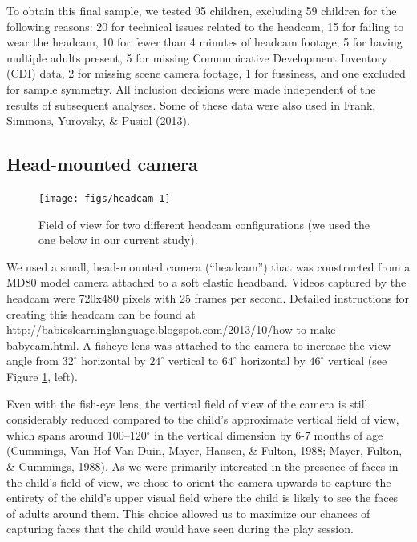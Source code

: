 \documentclass[10pt, letterpaper]{article}
\newenvironment{CodeChunk}{}{}
\begin{document}
To obtain this final sample, we tested 95 children, excluding 59
children for the following reasons: 20 for technical issues related to
the headcam, 15 for failing to wear the headcam, 10 for fewer than 4
minutes of headcam footage, 5 for having multiple adults present, 5 for
missing Communicative Development Inventory (CDI) data, 2 for missing
scene camera footage, 1 for fussiness, and one excluded for sample
symmetry. All inclusion decisions were made independent of the results
of subsequent analyses. Some of these data were also used in Frank,
Simmons, Yurovsky, \& Pusiol (2013).

\subsection{Head-mounted camera}\label{head-mounted-camera}

\begin{CodeChunk}
\begin{figure}[H]

{\centering \texttt{[image: figs/headcam-1]} 

}

\caption[Field of view for two different headcam configurations (we used the one below in our current study)]{Field of view for two different headcam configurations (we used the one below in our current study).}\label{fig:headcam}
\end{figure}
\end{CodeChunk}

We used a small, head-mounted camera (``headcam'') that was constructed
from a MD80 model camera attached to a soft elastic headband. Videos
captured by the headcam were 720x480 pixels with 25 frames per second.
Detailed instructions for creating this headcam can be found at
\url{http://babieslearninglanguage.blogspot.com/2013/10/how-to-make-babycam.html}.
A fisheye lens was attached to the camera to increase the view angle
from \(32^{\circ}\) horizontal by \(24^{\circ}\) vertical to
\(64^{\circ}\) horizontal by \(46^{\circ}\) vertical (see Figure
\ref{fig:headcam}, left).

Even with the fish-eye lens, the vertical field of view of the camera is
still considerably reduced compared to the child's approximate vertical
field of view, which spans around 100--120\(^{\circ}\) in the vertical
dimension by 6-7 months of age (Cummings, Van Hof-Van Duin, Mayer,
Hansen, \& Fulton, 1988; Mayer, Fulton, \& Cummings, 1988). As we were
primarily interested in the presence of faces in the child's field of
view, we chose to orient the camera upwards to capture the entirety of
the child's upper visual field where the child is likely to see the
faces of adults around them. This choice allowed us to maximize our
chances of capturing faces that the child would have seen during the
play session.
\end{document}
